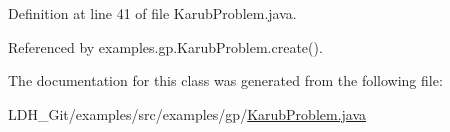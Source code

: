 Definition at line 41 of file Karub\-Problem.\-java.



Referenced by examples.\-gp.\-Karub\-Problem.\-create().



The documentation for this class was generated from the following file\-:\begin{DoxyCompactItemize}
\item 
L\-D\-H\-\_\-\-Git/examples/src/examples/gp/\hyperlink{_karub_problem_8java}{Karub\-Problem.\-java}\end{DoxyCompactItemize}
